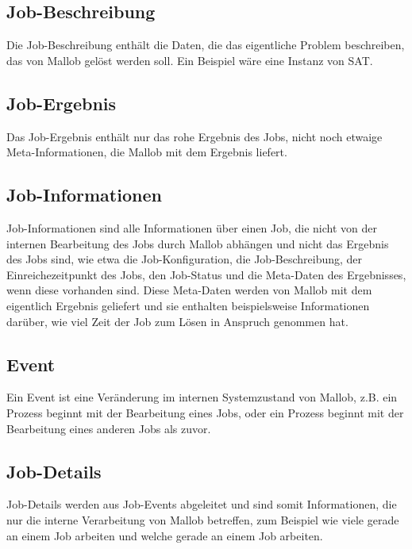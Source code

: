     
\subsection{Job-Beschreibung}
\label{B:Job-Beschreibung}
Die Job-Beschreibung enthält die Daten, die das eigentliche Problem beschreiben, das von \gls{Mallob} gelöst werden soll. Ein Beispiel wäre eine Instanz von \gls{SAT}.

\subsection{Job-Ergebnis}
\label{B:Job-Ergebnis}
Das Job-Ergebnis enthält nur das rohe Ergebnis des Jobs, nicht noch etwaige Meta-Informationen, die \gls{Mallob} mit dem Ergebnis liefert.

\subsection{Job-Informationen}
\label{B:Job-Informationen}
Job-Informationen sind alle Informationen über einen Job, die nicht von der internen Bearbeitung des Jobs durch \gls{Mallob} abhängen und nicht das Ergebnis des Jobs sind, wie etwa die Job-Konfiguration, die Job-Beschreibung, der Einreichezeitpunkt des Jobs, den Job-Status und die Meta-Daten des Ergebnisses, wenn diese vorhanden sind. Diese Meta-Daten werden von \gls{Mallob} mit dem eigentlich Ergebnis geliefert und sie enthalten beispielsweise Informationen darüber, wie viel Zeit der Job zum Lösen in Anspruch genommen hat.

\subsection{Event}
\label{B:Event}
Ein Event ist eine Veränderung im internen Systemzustand von \gls{Mallob}, z.B. ein \gls{Prozess} beginnt mit der Bearbeitung eines Jobs, oder ein \gls{Prozess} beginnt mit der Bearbeitung eines anderen Jobs als zuvor. 

\subsection{Job-Details}
\label{B:Job-Details}
Job-Details werden aus Job-Events abgeleitet und sind somit Informationen, die nur die interne Verarbeitung von \gls{Mallob} betreffen, zum Beispiel wie viele  gerade an einem Job arbeiten und welche  gerade an einem Job arbeiten. 

